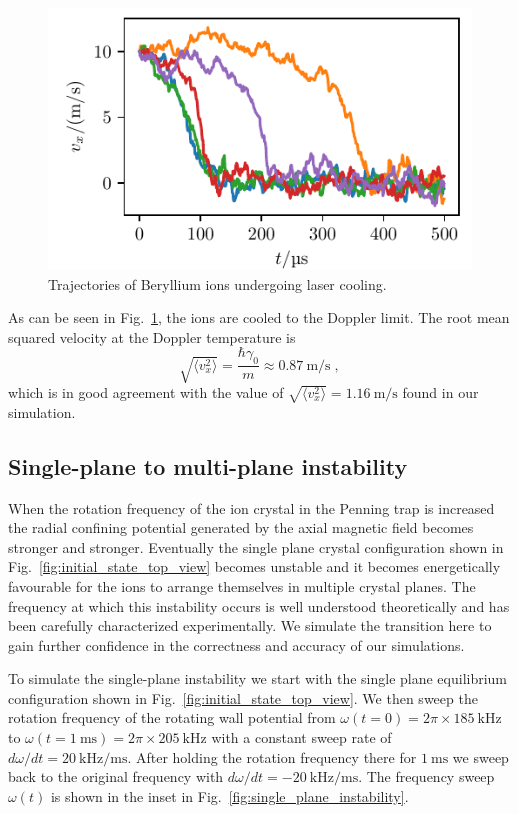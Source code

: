 \documentclass[aps, pra, preprint]{revtex4-1}
\begin{document}
\begin{figure}
  \includegraphics{./figures/fig_laser_cooling.pdf}
  \caption{Trajectories of Beryllium ions undergoing laser
    cooling.}
  \label{fig:FreeSpaceCooling}
\end{figure}
As can be seen in Fig.~\ref{fig:FreeSpaceCooling}, the ions are
cooled to the Doppler limit. The root mean squared velocity at the Doppler
temperature is
\begin{equation}
\sqrt{\langle v_x^2\rangle} = \frac{\hbar \gamma_0}{m} \approx
\SI{0.87}{\meter/\second}\;,
\end{equation}
which is in good agreement with the value of $\sqrt{\langle
  v_x^2\rangle}=\SI{1.16}{\meter/\second}$ found in our
simulation.


\subsection{Single-plane to multi-plane instability}
\label{sec:validation}

When the rotation frequency of the ion crystal in the Penning
trap is increased the radial confining potential generated by the
axial magnetic field becomes stronger and stronger. Eventually
the single plane crystal configuration shown in
Fig.~\ref{fig:initial_state_top_view} becomes unstable and it
becomes energetically favourable for the ions to arrange
themselves in multiple crystal planes. The frequency at which
this instability occurs is well understood
theoretically and has been carefully
characterized experimentally. We simulate the
transition here to gain further confidence in the correctness and
accuracy of our simulations. 

To simulate the single-plane instability we start with the single
plane equilibrium configuration shown in
Fig.~\ref{fig:initial_state_top_view}. We then sweep the rotation
frequency of the rotating wall potential from
$\omega(t=0)=2\pi\times\SI{185}{\kilo\hertz}$ to
$\omega(t=\SI{1}{\milli\second})=2\pi\times\SI{205}{\kilo\hertz}$ with
a constant sweep rate of $d\omega/dt =
\SI{20}{\kilo\hertz/\milli\second}$. After holding the rotation
frequency there for $\SI{1}{\milli\second}$ we sweep back to the
original frequency with
$d\omega/dt=-\SI{20}{\kilo\hertz/\milli\second}$. The frequency
sweep $\omega(t)$ is shown in the inset in
Fig.~\ref{fig:single_plane_instability}.
\end{document}
